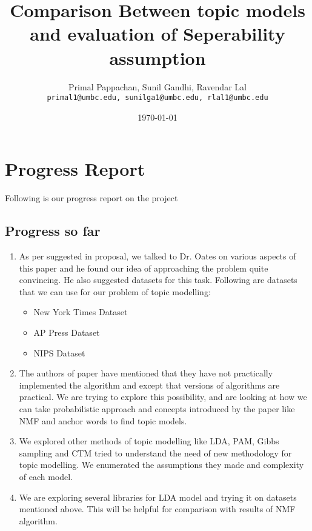 \documentclass[a4paper,11pt]{article}
\begin{document}

\title{Comparison Between topic models and evaluation of Seperability assumption}
\author{Primal Pappachan, Sunil Gandhi, Ravendar Lal \\ 
\texttt{primal1@umbc.edu, sunilga1@umbc.edu, rlal1@umbc.edu}}
\date{\today}
\maketitle



\section{Progress Report}
Following is our progress report on the project
\subsection{Progress so far}

\begin{enumerate}
\item As per suggested in proposal, we talked to Dr. Oates on various aspects of this paper and he found our idea of approaching the problem quite convincing. He also suggested datasets for this task. Following are datasets that we  can use for our problem of topic modelling:

\begin{itemize}
\item New York Times Dataset
\item AP Press Dataset
\item NIPS Dataset
\end{itemize}

\item The authors of paper have mentioned that they have not practically implemented the algorithm and except that versions of algorithms are practical. We are trying to explore this possibility, and are looking at how we can take probabilistic approach and concepts introduced by the paper like NMF and anchor words to find topic models.

\item We explored other methods of topic modelling like LDA, PAM, Gibbs sampling and CTM tried to understand the need of new methodology for topic modelling. We enumerated the assumptions they made and complexity of each model.
\item We are exploring several libraries for LDA model and trying it on datasets mentioned above. This will be helpful for comparison with results of NMF algorithm.

\end{enumerate}
\end{document}
